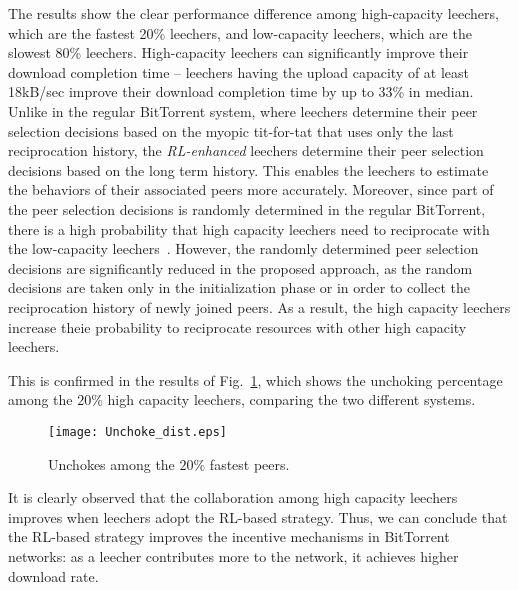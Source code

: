 The results show the clear performance difference among high-capacity leechers, 
which are the fastest 20\% leechers, and low-capacity leechers, which are the 
slowest 80\% leechers. 
High-capacity leechers can significantly improve their download
completion time -- leechers having the upload capacity of at least 18kB/sec 
improve their download completion time by up to 33\% in median. 
Unlike in the regular BitTorrent system, where leechers determine their peer 
selection decisions based on the myopic tit-for-tat that uses only the last 
reciprocation history, the \emph{RL-enhanced} leechers determine their peer 
selection decisions based on the long term history. This enables the leechers 
to estimate the behaviors of their associated peers more accurately. Moreover, 
since part of the peer selection decisions is randomly determined in the 
regular BitTorrent, there is a high probability that high capacity leechers 
need to reciprocate with the low-capacity leechers~\cite{piatek07}. 
However, the randomly determined peer selection decisions are significantly 
reduced in the proposed approach, as the random decisions are taken only in the 
initialization phase or in order to collect the reciprocation history of newly 
joined peers. 
As a result, the high capacity leechers increase theie probability to 
reciprocate resources with other high capacity leechers.

This is confirmed in the results of Fig.~\ref{fig:Unchoke_dist}, which shows 
the unchoking percentage among the $20\%$ high capacity leechers, 
comparing the two different systems.
\begin{figure}[t]
\centering
\texttt{[image: Unchoke\_dist.eps]}
\caption{Unchokes among the $20\%$ fastest peers.} 
\label{fig:Unchoke_dist}
\end{figure}
It is clearly observed that the collaboration among high capacity leechers 
improves when leechers adopt the RL-based strategy. 
Thus, we can conclude that the RL-based strategy improves the 
incentive mechanisms in BitTorrent networks: as a leecher contributes more to 
the network, it achieves higher download rate. 

